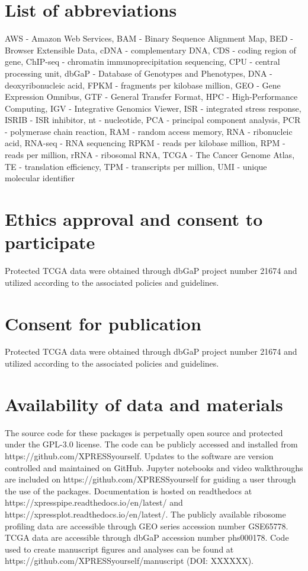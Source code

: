 \documentclass[11pt, a4paper, oneside]{article}
\begin{document}
\section*{List of abbreviations}
AWS - Amazon Web Services,
BAM - Binary Sequence Alignment Map,
BED - Browser Extensible Data,
cDNA - complementary DNA,
CDS - coding region of gene,
ChIP-seq - chromatin immunoprecipitation sequencing,
CPU - central processing unit,
dbGaP - Database of Genotypes and Phenotypes,
DNA - deoxyribonucleic acid,
FPKM - fragments per kilobase million,
GEO - Gene Expression Omnibus,
GTF - General Transfer Format,
HPC - High-Performance Computing,
IGV - Integrative Genomics Viewer,
ISR - integrated stress response,
ISRIB - ISR inhibitor,
nt - nucleotide,
PCA - principal component analysis,
PCR - polymerase chain reaction,
RAM - random access memory,
RNA - ribonucleic acid,
RNA-seq - RNA sequencing
RPKM - reads per kilobase million,
RPM - reads per million,
rRNA - ribosomal RNA,
TCGA - The Cancer Genome Atlas,
TE - translation efficiency,
TPM - transcripts per million,
UMI - unique molecular identifier

\section*{Ethics approval and consent to participate}
Protected TCGA data were obtained through dbGaP project number 21674 and utilized according to the associated policies and guidelines.

\section*{Consent for publication}
Protected TCGA data were obtained through dbGaP project number 21674 and utilized according to the associated policies and guidelines.

\section*{Availability of data and materials}
The source code for these packages is perpetually open source and protected under the GPL-3.0 license. The code can be publicly accessed and installed from https://github.com/XPRESSyourself. Updates to the software are version controlled and maintained on GitHub. Jupyter notebooks and video walkthroughs are included on https://github.com/XPRESSyourself for guiding a user through the use of the packages. Documentation is hosted on readthedocs \cite{readthedocs} at https://xpresspipe.readthedocs.io/en/latest/ and https://xpressplot.readthedocs.io/en/latest/. The publicly available ribosome profiling data are accessible through GEO series accession number GSE65778. TCGA data are accessible through dbGaP accession number phs000178. Code used to create manuscript figures and analyses can be found at https://github.com/XPRESSyourself/manuscript (DOI: XXXXXX).
\end{document}
